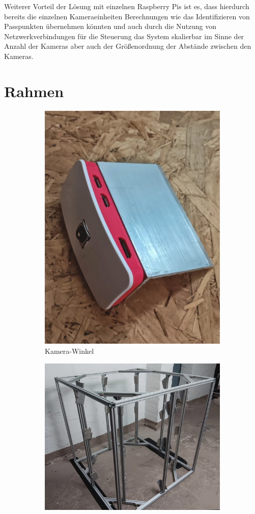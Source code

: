 \documentclass[./00PhotoBox.tex]{subfiles}
\begin{document}
Weiterer Vorteil der Lösung mit einzelnen Raspberry Pis ist es, dass hierdurch bereits die einzelnen Kameraeinheiten Berechnungen wie das Identifizieren von Passpunkten übernehmen könnten und auch durch die Nutzung von Netzwerkverbindungen für die Steuerung das System skalierbar im Sinne der Anzahl der Kameras aber auch der Größenordnung der Abstände zwischen den Kameras.

\section{Rahmen}

\begin{figure}
    \centering
    \begin{subfigure}{0.45\textwidth}
        \includegraphics[height=0.9\linewidth]{./img/aluwinkel.jpg}
        \centering
        \caption{Kamera-Winkel} %
        \label{img:aluwinkel} %
    \end{subfigure}
    \begin{subfigure}{0.45\textwidth}
        \includegraphics[height=0.8\linewidth]{./img/alurahmen.jpg}

\end{subfigure}
\end{figure}
\end{document}
